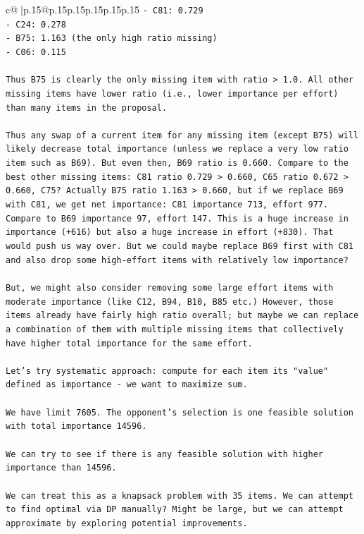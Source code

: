 \documentclass{article}
\begin{document}
{\begin{supertabular}{c@{$\;$}|p{.15\linewidth}@{}p{.15\linewidth}p{.15\linewidth}p{.15\linewidth}p{.15\linewidth}p{.15\linewidth}}
{{{\texttt{{-} C81: 0.729} \\
\texttt{{-} C24: 0.278} \\
\texttt{{-} B75: 1.163 (the only high ratio missing)} \\
\texttt{{-} C06: 0.115} \\
\\ 
\texttt{Thus B75 is clearly the only missing item with ratio > 1.0. All other missing items have lower ratio (i.e., lower importance per effort) than many items in the proposal.} \\
\\ 
\texttt{Thus any swap of a current item for any missing item (except B75) will likely decrease total importance (unless we replace a very low ratio item such as B69). But even then, B69 ratio is 0.660. Compare to the best other missing items: C81 ratio 0.729 > 0.660, C65 ratio 0.672 > 0.660, C75? Actually B75 ratio 1.163 > 0.660, but if we replace B69 with C81, we get net importance: C81 importance 713, effort 977. Compare to B69 importance 97, effort 147. This is a huge increase in importance (+616) but also a huge increase in effort (+830). That would push us way over. But we could maybe replace B69 first with C81 and also drop some high{-}effort items with relatively low importance?} \\
\\ 
\texttt{But, we might also consider removing some large effort items with moderate importance (like C12, B94, B10, B85 etc.) However, those items already have fairly high ratio overall; but maybe we can replace a combination of them with multiple missing items that collectively have higher total importance for the same effort.} \\
\\ 
\texttt{Let's try systematic approach: compute for each item its "value" defined as importance {-} we want to maximize sum.} \\
\\ 
\texttt{We have limit 7605. The opponent's selection is one feasible solution with total importance 14596.} \\
\\ 
\texttt{We can try to see if there is any feasible solution with higher importance than 14596.} \\
\\ 
\texttt{We can treat this as a knapsack problem with 35 items. We can attempt to find optimal via DP manually? Might be large, but we can attempt approximate by exploring potential improvements.} \\
}}}
\end{supertabular}}
\end{document}
